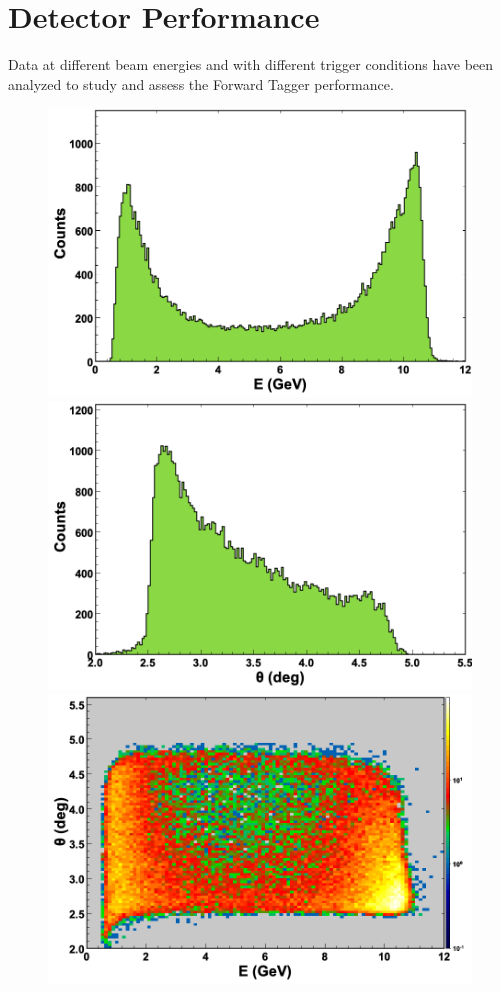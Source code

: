\section{Detector Performance}\label{sec:performance}

Data at different beam energies and with different trigger conditions have been analyzed to study and assess the
Forward Tagger performance. 

\begin{figure}[ht]
\begin{center}
\includegraphics[height=0.5\columnwidth]{fig/ft_acceptance_energy.png}
\includegraphics[height=0.5\columnwidth]{fig/ft_acceptance_theta.png}
\includegraphics[height=0.5\columnwidth]{fig/ft_acceptance_energytheta.png}

\end{center}
\end{figure}
